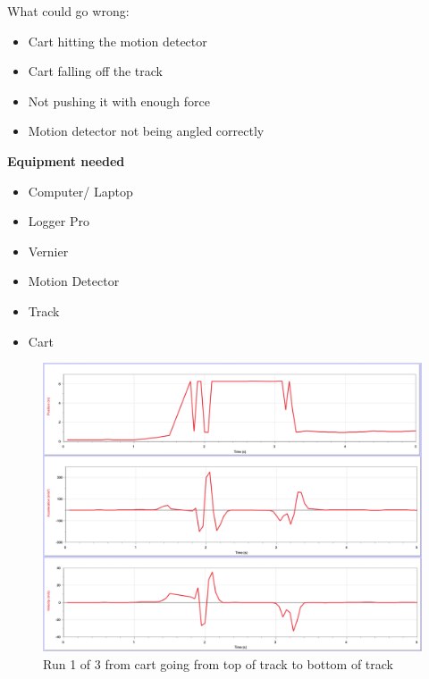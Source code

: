 \documentclass[idxtotoc,hyperref,openany]{labbook} %
\begin{document}
\hfill \break
What could go wrong:
\begin{itemize}
    \item Cart hitting the motion detector
    \item Cart falling off the track
    \item Not pushing it with enough force
    \item Motion detector not being angled correctly
\end{itemize}

\hfill \break
\textbf{Equipment needed}
\begin{itemize}
    \item Computer/ Laptop
    \item Logger Pro
    \item Vernier
    \item Motion Detector
    \item Track
    \item Cart
\end{itemize}


\newpage
\hfill \break
{}
\begin{figure}[H] %
\begin{center}
\includegraphics[width=1\linewidth]{images/Lab.02/GoDown1.png}
\end{center}
\caption{Run 1 of 3 from cart going from top of track to bottom of track}
\label{fig:Data of Cart GoDown1}
\end{figure}
\end{document}
